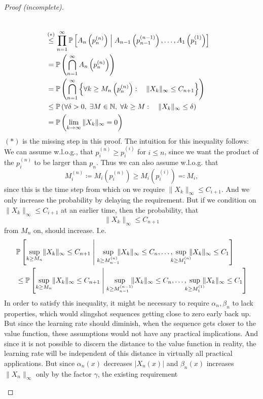 \begin{proof}[Proof (incomplete)]
\begin{enumerate}[label= Step \arabic*:, ref= Step \arabic*, leftmargin=0pt]
\begin{align}
        \nonumber\\
        &\lxlq{(*)}\prod_{n=1}^\infty\Pr\left[ A_n\left( p_n^{(n)}\right)\;\middle|\; A_{n-1}\left( p_{n-1}^{(n-1)}\right),\dots, A_1\left(p_1^{(1)} \right)\right]
        \nonumber\\
        &=\Pr\left(\bigcap_{n=1}^\infty A_n\left( p_n^{(n)}\right) \right)
        \nonumber\\
        &=\Pr\left(\bigcap_{n=1}^\infty \left\{\forall k\ge M_n\left( p_n^{(n)}\right): \quad \|X_k\|_\infty \le C_{n+1}\right\} \right)
        \label{smaller limit equals 0}\\
        &\le\Pr\left( \forall \delta>0,\; \exists M\in\N,\;  \forall k\ge M: \quad  \|X_k\|_\infty \le \delta \right)
        \nonumber\\
        &=\Pr\left( \lim_{k\to\infty}\|X_k\|_\infty=0 \right)
        \nonumber
    \end{align}
    \((*)\) is the missing step in this proof. The intuition for this inequality follows: We can assume w.l.o.g., that  \(p_i^{(n)}\ge p_i^{(i)} \) for \(i\le n\), since we want the product of the \(p_i^{(n)}\) to be larger than \(p_n\). Thus we can also assume w.l.o.g. that 
    \[
        M_i^{(n)}\coloneqq M_i\left(p_i^{(n)}\right)\ge M_i\left(p_i^{(i)}\right)\eqqcolon M_i, 
    \] 
    since this is the time step from which on we require \(\|X_k\|_\infty\le C_{i+1} \). And we only increase the probability by delaying the requirement. 
    But if we condition on \(\|X_k\|_\infty \le C_{i+1} \) at an earlier time, then the probability, that
    \[
        \|X_k\|_\infty\le C_{n+1} 
    \]
    from \(M_n\) on, should increase. I.e.
    \begin{align*}
        &\Pr\left[
            \sup_{k\ge M_n} \!\|X_k\|_\infty \le C_{n+1} 
        \;\middle|\;  
            \sup_{k\ge M_{n-1}^{(n)}}
            \!\!\!\|X_k\|_\infty \le C_{n},\dots,\; 
            \smashoperator[l]{\sup_{k\ge M_{1}^{(n)}}}
            \!\!\!\|X_k\|_\infty \le C_{1} 
        \right]\\
        &\le \Pr\left[
            \sup_{k\ge M_n}\! \|X_k\|_\infty \le C_{n+1} 
        \;\middle|\;  
            \sup_{k\ge M_{n-1}^{(n-1)}} 
            \!\!\!\|X_k\|_\infty \le C_{n},\dots,\; 
            \smashoperator[l]{\sup_{k\ge M_{1}^{(1)}}}
            \!\!\!\|X_k\|_\infty \le C_{1} 
        \right]
    \end{align*}
    In order to satisfy this inequality, it might be necessary to require \(\alpha_n, \beta_n\) to lack properties, which would slingshot sequences getting close to zero early back up. But since the learning rate should diminish, when the sequence gets closer to the value function, these assumptions would not have any practical implications. And since it is not possible to discern the distance to the value function in reality, the learning rate will be independent of this distance in virtually all practical applications.  But since \(\alpha_n(x)\) decreases \(|X_n(x)|\) and \(\beta_n(x)\) increases \(\|X_n\|_\infty\) only by the factor \(\gamma\), the existing requirement

\end{enumerate}
\end{proof}
